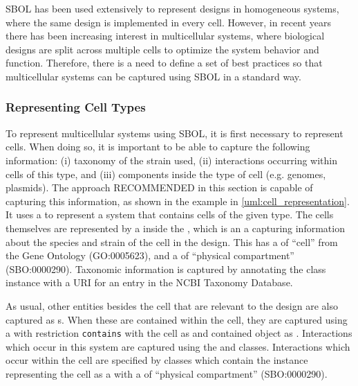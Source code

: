 SBOL has been used extensively to represent designs in homogeneous systems, where the same design is implemented in every cell. However, in recent years there has been increasing interest in multicellular systems, where biological designs are split across multiple cells to optimize the system behavior and function. Therefore, there is a need to define a set of best practices so that multicellular systems can be captured using SBOL in a standard way.

\subsubsection{Representing Cell Types}
\label{bp:cells}

To represent multicellular systems using SBOL, it is first necessary to represent cells. 
When doing so, it is important to be able to capture the following information: (i) taxonomy of the strain used, (ii) interactions occurring within cells of this type, and (iii) components inside the type of cell (e.g. genomes, plasmids). 
The approach RECOMMENDED in this section is capable of capturing this information, as shown in the example in \ref{uml:cell_representation}. 
It uses a  to represent a system that contains cells of the given type.
The cells themselves are represented by a  inside the , which is an  
a  capturing information about the species and strain of the cell in the design. 
This  has a  of ``cell'' from the Gene Ontology (GO:0005623), and a  of ``physical compartment'' (SBO:0000290).
Taxonomic information is captured by annotating the class instance with a URI for an entry in the NCBI Taxonomy Database. 

As usual, other entities besides the cell that are relevant to the design are also captured as s.
When these are contained within the cell, they are captured using a  with restriction \texttt{contains} with the cell as  and contained object as .
Interactions which occur in this system are captured using the  and  classes. 
Interactions which occur within the cell are specified by  classes which contain the  instance representing the cell as a  with a  of ``physical compartment'' (SBO:0000290).

